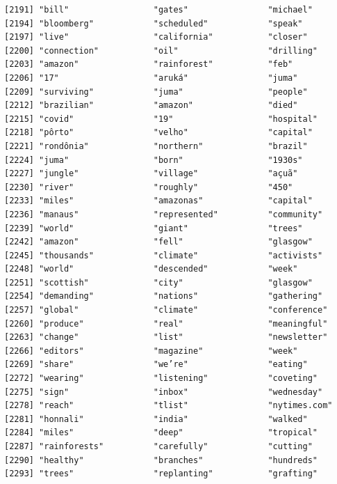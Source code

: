 \documentclass[
  letterpaper,
  DIV=11,
  numbers=noendperiod]{scrartcl}
\begin{document}
\begin{verbatim}
[2191] "bill"                 "gates"                "michael"             
[2194] "bloomberg"            "scheduled"            "speak"               
[2197] "live"                 "california"           "closer"              
[2200] "connection"           "oil"                  "drilling"            
[2203] "amazon"               "rainforest"           "feb"                 
[2206] "17"                   "aruká"                "juma"                
[2209] "surviving"            "juma"                 "people"              
[2212] "brazilian"            "amazon"               "died"                
[2215] "covid"                "19"                   "hospital"            
[2218] "pôrto"                "velho"                "capital"             
[2221] "rondônia"             "northern"             "brazil"              
[2224] "juma"                 "born"                 "1930s"               
[2227] "jungle"               "village"              "açuã"                
[2230] "river"                "roughly"              "450"                 
[2233] "miles"                "amazonas"             "capital"             
[2236] "manaus"               "represented"          "community"           
[2239] "world"                "giant"                "trees"               
[2242] "amazon"               "fell"                 "glasgow"             
[2245] "thousands"            "climate"              "activists"           
[2248] "world"                "descended"            "week"                
[2251] "scottish"             "city"                 "glasgow"             
[2254] "demanding"            "nations"              "gathering"           
[2257] "global"               "climate"              "conference"          
[2260] "produce"              "real"                 "meaningful"          
[2263] "change"               "list"                 "newsletter"          
[2266] "editors"              "magazine"             "week"                
[2269] "share"                "we’re"                "eating"              
[2272] "wearing"              "listening"            "coveting"            
[2275] "sign"                 "inbox"                "wednesday"           
[2278] "reach"                "tlist"                "nytimes.com"         
[2281] "honnali"              "india"                "walked"              
[2284] "miles"                "deep"                 "tropical"            
[2287] "rainforests"          "carefully"            "cutting"             
[2290] "healthy"              "branches"             "hundreds"            
[2293] "trees"                "replanting"           "grafting"            

\end{verbatim}
\end{document}

